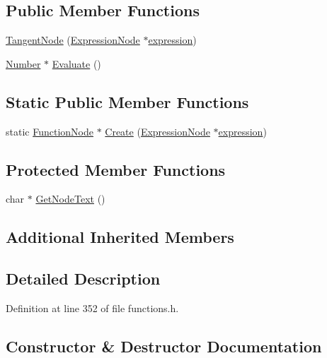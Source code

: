\subsection*{Public Member Functions}
\begin{DoxyCompactItemize}
\item 
\hyperlink{classTangentNode_a6feab62e09d65651a67a11e691afd9c0}{Tangent\+Node} (\hyperlink{classExpressionNode}{Expression\+Node} $\ast$\hyperlink{classFunctionNode_ad7577b179a1937aaf8a0058bb5b546dc}{expression})
\item 
\hyperlink{structNumber}{Number} $\ast$ \hyperlink{classTangentNode_a1ec2c48b6f174080a3f121773cf86237}{Evaluate} ()
\end{DoxyCompactItemize}
\subsection*{Static Public Member Functions}
\begin{DoxyCompactItemize}
\item 
static \hyperlink{classFunctionNode}{Function\+Node} $\ast$ \hyperlink{classTangentNode_ae71e32f065988aa0536e2d5420b23b52}{Create} (\hyperlink{classExpressionNode}{Expression\+Node} $\ast$\hyperlink{classFunctionNode_ad7577b179a1937aaf8a0058bb5b546dc}{expression})
\end{DoxyCompactItemize}
\subsection*{Protected Member Functions}
\begin{DoxyCompactItemize}
\item 
char $\ast$ \hyperlink{classTangentNode_a2e5cdc4ca56b858386120cd5e8d89e56}{Get\+Node\+Text} ()
\end{DoxyCompactItemize}
\subsection*{Additional Inherited Members}


\subsection{Detailed Description}


Definition at line 352 of file functions.\+h.



\subsection{Constructor \& Destructor Documentation}
